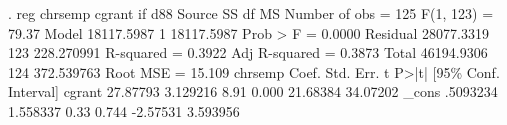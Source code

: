 . reg chrsemp cgrant if d88
{\smallskip}
      Source {\VBAR}       SS           df       MS      Number of obs   =       125
   F(1, 123)       =     79.37
       Model {\VBAR}  18117.5987         1  18117.5987   Prob > F        =    0.0000
    Residual {\VBAR}  28077.3319       123  228.270991   R-squared       =    0.3922
   Adj R-squared   =    0.3873
       Total {\VBAR}  46194.9306       124  372.539763   Root MSE        =    15.109
{\smallskip}
     chrsemp {\VBAR}      Coef.   Std. Err.      t    P>|t|     [95\% Conf. Interval]
      cgrant {\VBAR}   27.87793   3.129216     8.91   0.000     21.68384    34.07202
       _cons {\VBAR}   .5093234   1.558337     0.33   0.744     -2.57531    3.593956
{\smallskip}
